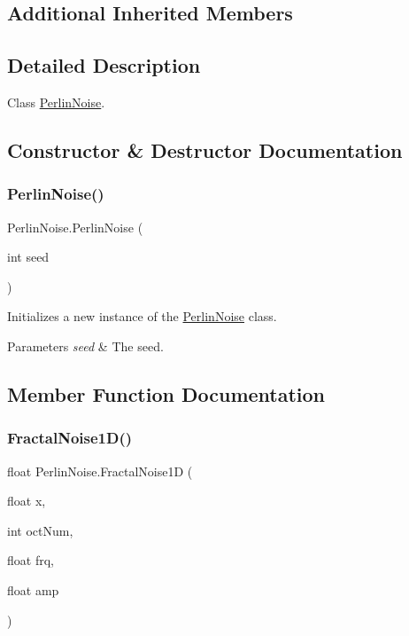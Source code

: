 \subsection*{Additional Inherited Members}


\subsection{Detailed Description}
Class \hyperlink{class_perlin_noise}{Perlin\+Noise}. 



\subsection{Constructor \& Destructor Documentation}
\mbox{\label{class_perlin_noise_ac14b2a75496fa726a113b01c52b81279}} 
\subsubsection{\texorpdfstring{Perlin\+Noise()}{PerlinNoise()}}
{\footnotesize\ttfamily Perlin\+Noise.\+Perlin\+Noise (\begin{DoxyParamCaption}\item[{int}]{seed }\end{DoxyParamCaption})\hspace{0.3cm}{\ttfamily [inline]}}



Initializes a new instance of the \hyperlink{class_perlin_noise}{Perlin\+Noise} class. 


\begin{DoxyParams}{Parameters}
{\em seed} & The seed.\\
\hline
\end{DoxyParams}


\subsection{Member Function Documentation}
\mbox{\label{class_perlin_noise_afd838a3594e55a953557fbecae3c3c09}} 
\subsubsection{\texorpdfstring{Fractal\+Noise1\+D()}{FractalNoise1D()}}
{\footnotesize\ttfamily float Perlin\+Noise.\+Fractal\+Noise1D (\begin{DoxyParamCaption}\item[{float}]{x,  }\item[{int}]{oct\+Num,  }\item[{float}]{frq,  }\item[{float}]{amp }\end{DoxyParamCaption})\hspace{0.3cm}{\ttfamily [inline]}}



